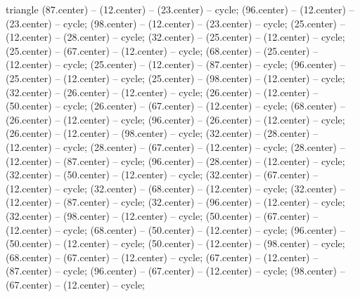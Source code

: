 {\begin{pgfonlayer}{triangle}
 (87.center) -- (12.center) -- (23.center) -- cycle; 
 (96.center) -- (12.center) -- (23.center) -- cycle; 
 (98.center) -- (12.center) -- (23.center) -- cycle; 
 (25.center) -- (12.center) -- (28.center) -- cycle; 
 (32.center) -- (25.center) -- (12.center) -- cycle; 
 (25.center) -- (67.center) -- (12.center) -- cycle; 
 (68.center) -- (25.center) -- (12.center) -- cycle; 
 (25.center) -- (12.center) -- (87.center) -- cycle; 
 (96.center) -- (25.center) -- (12.center) -- cycle; 
 (25.center) -- (98.center) -- (12.center) -- cycle; 
 (32.center) -- (26.center) -- (12.center) -- cycle; 
 (26.center) -- (12.center) -- (50.center) -- cycle; 
 (26.center) -- (67.center) -- (12.center) -- cycle; 
 (68.center) -- (26.center) -- (12.center) -- cycle; 
 (96.center) -- (26.center) -- (12.center) -- cycle; 
 (26.center) -- (12.center) -- (98.center) -- cycle; 
 (32.center) -- (28.center) -- (12.center) -- cycle; 
 (28.center) -- (67.center) -- (12.center) -- cycle; 
 (28.center) -- (12.center) -- (87.center) -- cycle; 
 (96.center) -- (28.center) -- (12.center) -- cycle; 
 (32.center) -- (50.center) -- (12.center) -- cycle; 
 (32.center) -- (67.center) -- (12.center) -- cycle; 
 (32.center) -- (68.center) -- (12.center) -- cycle; 
 (32.center) -- (12.center) -- (87.center) -- cycle; 
 (32.center) -- (96.center) -- (12.center) -- cycle; 
 (32.center) -- (98.center) -- (12.center) -- cycle; 
 (50.center) -- (67.center) -- (12.center) -- cycle; 
 (68.center) -- (50.center) -- (12.center) -- cycle; 
 (96.center) -- (50.center) -- (12.center) -- cycle; 
 (50.center) -- (12.center) -- (98.center) -- cycle; 
 (68.center) -- (67.center) -- (12.center) -- cycle; 
 (67.center) -- (12.center) -- (87.center) -- cycle; 
 (96.center) -- (67.center) -- (12.center) -- cycle; 
 (98.center) -- (67.center) -- (12.center) -- cycle; 

\end{pgfonlayer}}
